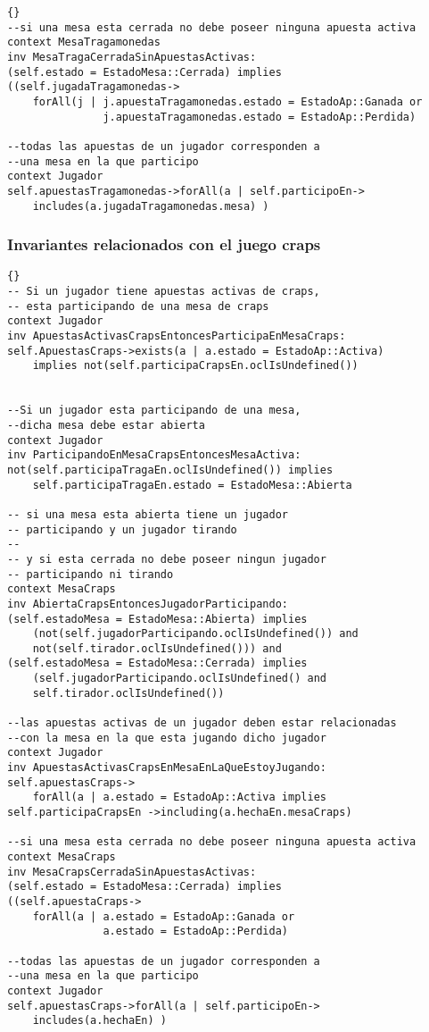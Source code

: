 \begin{framed}
\begin{lstlisting}[frame=trbl]{}
--si una mesa esta cerrada no debe poseer ninguna apuesta activa
context MesaTragamonedas
inv MesaTragaCerradaSinApuestasActivas:
(self.estado = EstadoMesa::Cerrada) implies 
((self.jugadaTragamonedas->
    forAll(j | j.apuestaTragamonedas.estado = EstadoAp::Ganada or 
               j.apuestaTragamonedas.estado = EstadoAp::Perdida)

--todas las apuestas de un jugador corresponden a 
--una mesa en la que participo
context Jugador
self.apuestasTragamonedas->forAll(a | self.participoEn->
    includes(a.jugadaTragamonedas.mesa) )
\end{lstlisting}

\subsubsection{Invariantes relacionados con el juego craps}

\lstset{language=ocl}
\lstset{commentstyle=\textit}
\begin{lstlisting}[frame=trbl]{}
-- Si un jugador tiene apuestas activas de craps,
-- esta participando de una mesa de craps
context Jugador
inv ApuestasActivasCrapsEntoncesParticipaEnMesaCraps:
self.ApuestasCraps->exists(a | a.estado = EstadoAp::Activa)
    implies not(self.participaCrapsEn.oclIsUndefined())
    
    
--Si un jugador esta participando de una mesa, 
--dicha mesa debe estar abierta
context Jugador
inv ParticipandoEnMesaCrapsEntoncesMesaActiva:
not(self.participaTragaEn.oclIsUndefined()) implies
    self.participaTragaEn.estado = EstadoMesa::Abierta

-- si una mesa esta abierta tiene un jugador 
-- participando y un jugador tirando
--
-- y si esta cerrada no debe poseer ningun jugador 
-- participando ni tirando
context MesaCraps
inv AbiertaCrapsEntoncesJugadorParticipando:
(self.estadoMesa = EstadoMesa::Abierta) implies 
    (not(self.jugadorParticipando.oclIsUndefined()) and
    not(self.tirador.oclIsUndefined())) and
(self.estadoMesa = EstadoMesa::Cerrada) implies 
    (self.jugadorParticipando.oclIsUndefined() and
    self.tirador.oclIsUndefined())
    
--las apuestas activas de un jugador deben estar relacionadas 
--con la mesa en la que esta jugando dicho jugador
context Jugador
inv ApuestasActivasCrapsEnMesaEnLaQueEstoyJugando:
self.apuestasCraps->
    forAll(a | a.estado = EstadoAp::Activa implies 
self.participaCrapsEn ->including(a.hechaEn.mesaCraps)

--si una mesa esta cerrada no debe poseer ninguna apuesta activa
context MesaCraps
inv MesaCrapsCerradaSinApuestasActivas:
(self.estado = EstadoMesa::Cerrada) implies 
((self.apuestaCraps->
    forAll(a | a.estado = EstadoAp::Ganada or 
               a.estado = EstadoAp::Perdida)

--todas las apuestas de un jugador corresponden a 
--una mesa en la que participo
context Jugador
self.apuestasCraps->forAll(a | self.participoEn->
    includes(a.hechaEn) )

\end{lstlisting}
\end{framed}

